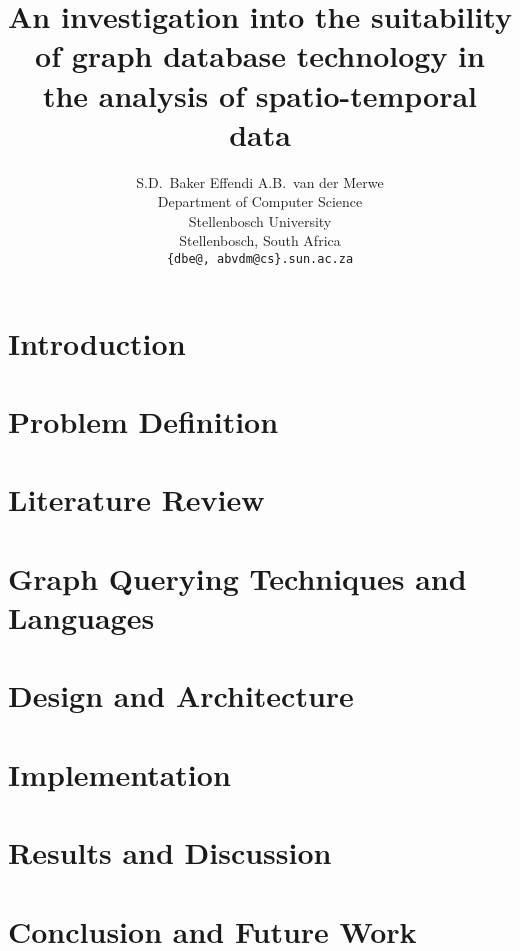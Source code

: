 \documentclass{article}
\title{An investigation into the suitability of graph database technology in the analysis of spatio-temporal data}
\author{
  S.D.~Baker Effendi \qquad  A.B.~van der Merwe \\
  Department of Computer Science\\
  Stellenbosch University\\
  Stellenbosch, South Africa \\
  \texttt{\{dbe@, abvdm@cs\}.sun.ac.za} \\
}
\begin{document}
\maketitle



\twocolumn

\section{Introduction}

\FloatBarrier

\section{Problem Definition}
\label{sec:prob-def}

\FloatBarrier

\section{Literature Review}
\label{sec:lit-rev}

\FloatBarrier

\section{Graph Querying Techniques and Languages}
\label{sec:graph-lang}

\FloatBarrier

\section{Design and Architecture}
\label{sec:des-arch}

\FloatBarrier

\section{Implementation}
\label{sec:impl}


\section{Results and Discussion}
\label{sec:experiments}


\section{Conclusion and Future Work}
\label{sec:conclusion}






\appendix
\appendixpage

\end{document}
